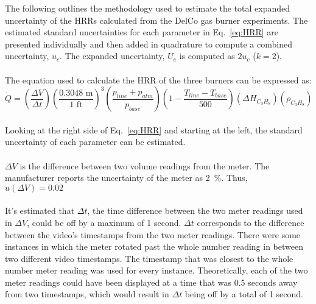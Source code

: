 \documentclass[12pt]{article}
\begin{document}
\noindent The following outlines the methodology used to estimate the total expanded uncertainty of the HRRs calculated from the DelCo gas burner experiments. The estimated standard uncertainties for each parameter in Eq.~\ref{eq:HRR} are presented individually and then added in quadrature to compute a combined uncertainty, $u_c$. The expanded uncertainty, $U_e$ is computed as $2u_c$ ($k=2$).
\\~\\
The equation used to calculate the HRR of the three burners can be expressed as:
\begin{equation}\label{eq:HRR}
\dot{Q} = \left(\frac{\Delta V}{\Delta t} \right) \left( \frac{0.3048\textrm{ m}}{1\textrm{ ft}} \right)^3 \left( \frac{p_{line}+p_{atm}}{p_{base}} \right) \left( 1-\frac{T_{line}-T_{base}}{500} \right) (\Delta H_{C_3H_8}) (\rho_{C_3H_8})
\end{equation}
\vspace{3pt}
\\
Looking at the right side of Eq.~\ref{eq:HRR} and starting at the left, the standard uncertainty of each parameter can be estimated.
\\~\\
$\Delta V$ is the difference between two volume readings from the meter. The manufacturer reports the uncertainty of the meter as 2~\%. Thus, 
\vspace{3pt}
\\
\indent \underline{$u(\Delta V)=0.02$} 
\\~\\
It's estimated that $\Delta t$, the time difference between the two meter readings used in $\Delta V$, could be off by a maximum of 1 second. $\Delta t$ corresponds to the difference between the video's timestamps from the two meter readings. There were some instances in which the meter rotated past the whole number reading in between two different video timestamps. The timestamp that was closest to the whole number meter reading was used for every instance. Theoretically, each of the two meter readings could have been displayed at a time that was 0.5 seconds away from two timestamps, which would result in $\Delta t$ being off by a total of 1 second. 
\end{document}
